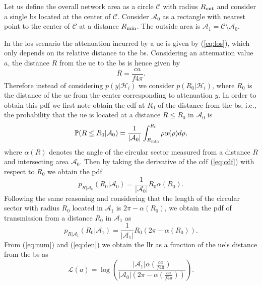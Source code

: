 \documentclass[conference,draftcls,onecolumn]{IEEEtran}
\begin{document}
Let us define the overall network area as a circle $\mathcal{C}$ with radius $R_{\rm out}$ and consider a single \ac{bs} located at the center of $\mathcal{C}$. Consider $\mathcal{A}_{0}$ as a rectangle with nearest point to the center of $\mathcal{C}$ at a distance $R_{\rm min}$. The outside area is $\mathcal{A}_1 = \mathcal{C} \setminus \mathcal{A}_0$.

In the \ac{los} scenario the attenuation incurred by a \ac{ue} is given by (\ref{eq:los}), which only depends on its relative distance to the \ac{bs}. Considering an attenuation value $a$, the distance $R$ from the \ac{ue} to the \ac{bs} is hence given by 
\begin{equation}
    R = \frac{c a}{f 4 \pi}.
\end{equation}
Therefore instead of considering $p(y|\mathcal H_i)$ we consider $p(R_0|\mathcal H_i)$, where $R_0$ is the distance of the \ac{ue} from the center corresponding to attenuation $y$. In order to obtain this \ac{pdf} we first note obtain the \ac{cdf} at $R_0$ of the distance from the \ac{bs}, i.e.,  the probability that the \ac{ue} is located at a distance $R\le R_0$ in $\mathcal{A}_0$ is
\begin{equation}\label{eq:cdf}
     \mathbb{P}(R \le R_0|\mathcal{A}_0) = \frac{1}{|\mathcal{A}_0|}\int_{R_{\rm min}}^{R_0} \rho \alpha(\rho) d\rho,
\end{equation}
where $\alpha(R)$ denotes the angle of the circular sector measured from a distance $R$ and intersecting area $\mathcal{A}_0$. Then by taking the derivative of the \ac{cdf} (\ref{eq:cdf}) with respect to $R_0$ we obtain the \ac{pdf} 
\begin{equation}\label{eq:num}
    p_{R|\mathcal{A}_0}(R_0|\mathcal{A}_0) = \frac{1}{|\mathcal{A}_0|}R_0\alpha(R_0).
\end{equation}
Following the same reasoning and considering that the length of the circular sector with radius $R_0$ located in $\mathcal{A}_1$ is $2\pi - \alpha(R_0)$, we obtain the \ac{pdf} of transmission from a distance $R_0$ in $\mathcal{A}_1$ as
\begin{equation}\label{eq:den}
     p_{R|\mathcal{A}_1}(R_0|\mathcal{A}_1) = \frac{1}{|\mathcal{A}_1|}R_0\left(2\pi-\alpha(R_0)\right).
\end{equation}
From (\ref{eq:num}) and (\ref{eq:den}) we obtain the \ac{llr} as a function of the \ac{ue}'s distance from the \ac{bs} as 
\begin{equation}
    \mathcal{L}(a)=\log\left(\frac{|\mathcal{A}_1|\alpha(\frac{c a}{f 4 \pi})}{|\mathcal{A}_0|\left(2\pi-\alpha(\frac{c a}{f 4 \pi})\right)}\right).
\end{equation}
\end{document}
